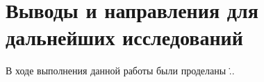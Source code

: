 \chapter{Выводы и направления для дальнейших исследований} \label{conclusion}


В ходе выполнения данной работы были проделаны \...

\clearpage
